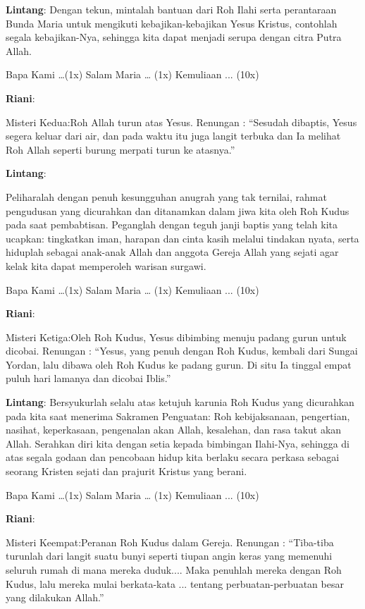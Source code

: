 \documentclass[12pt]{article}
\def\petugasA{\textbf{Riani}}
\def\petugasB{\textbf{Lintang}}
\begin{document}
\petugasB: Dengan tekun, mintalah bantuan dari Roh Ilahi serta perantaraan
Bunda Maria untuk mengikuti kebajikan-kebajikan Yesus Kristus,
contohlah segala kebajikan-Nya, sehingga kita dapat menjadi serupa
dengan citra Putra Allah.

 Bapa Kami {\dots}(1x) Salam Maria {\dots} (1x) Kemuliaan ... (10x)

\petugasA:

Misteri Kedua:{\textquotedbl}Roh Allah turun atas Yesus.{\textquotedbl}
Renungan : {\textquotedblleft}Sesudah dibaptis, Yesus segera keluar
dari air, dan pada waktu itu juga langit terbuka dan Ia melihat Roh
Allah seperti burung merpati turun ke atasnya.{\textquotedblright}

\petugasB:

Peliharalah dengan penuh kesungguhan anugrah yang tak ternilai, rahmat
pengudusan yang dicurahkan dan ditanamkan dalam jiwa kita oleh Roh
Kudus pada saat pembabtisan. Peganglah dengan teguh janji baptis yang
telah kita ucapkan: tingkatkan iman, harapan dan cinta kasih melalui
tindakan nyata, serta hiduplah sebagai anak-anak Allah dan anggota
Gereja Allah yang sejati agar kelak kita dapat memperoleh warisan
surgawi.

 Bapa Kami {\dots}(1x) Salam Maria {\dots} (1x) Kemuliaan ... (10x)

\petugasA:

Misteri Ketiga:{\textquotedbl}Oleh Roh Kudus, Yesus dibimbing menuju
padang gurun untuk dicobai.{\textquotedbl} Renungan :
{\textquotedblleft}Yesus, yang penuh dengan Roh Kudus, kembali dari
Sungai Yordan, lalu dibawa oleh Roh Kudus ke padang gurun. Di situ Ia
tinggal empat puluh hari lamanya dan dicobai Iblis.{\textquotedblright}

\petugasB: Bersyukurlah selalu atas ketujuh karunia Roh Kudus yang dicurahkan
pada kita saat menerima Sakramen Penguatan: Roh kebijaksanaan,
pengertian, nasihat, keperkasaan, pengenalan akan Allah, kesalehan, dan
rasa takut akan Allah. Serahkan diri kita dengan setia kepada bimbingan
Ilahi-Nya, sehingga di atas segala godaan dan pencobaan hidup kita
berlaku secara perkasa sebagai seorang Kristen sejati dan prajurit
Kristus yang berani.

Bapa Kami {\dots}(1x) Salam Maria {\dots} (1x) Kemuliaan ... (10x)

\petugasA:

Misteri Keempat:{\textquotedbl}Peranan Roh Kudus dalam
Gereja.{\textquotedbl} Renungan : {\textquotedblleft}Tiba-tiba turunlah
dari langit suatu bunyi seperti tiupan angin keras yang memenuhi
seluruh rumah di mana mereka duduk.... Maka penuhlah mereka dengan Roh
Kudus, lalu mereka mulai berkata-kata ... tentang perbuatan-perbuatan
besar yang dilakukan Allah.{\textquotedblright}
\end{document}
